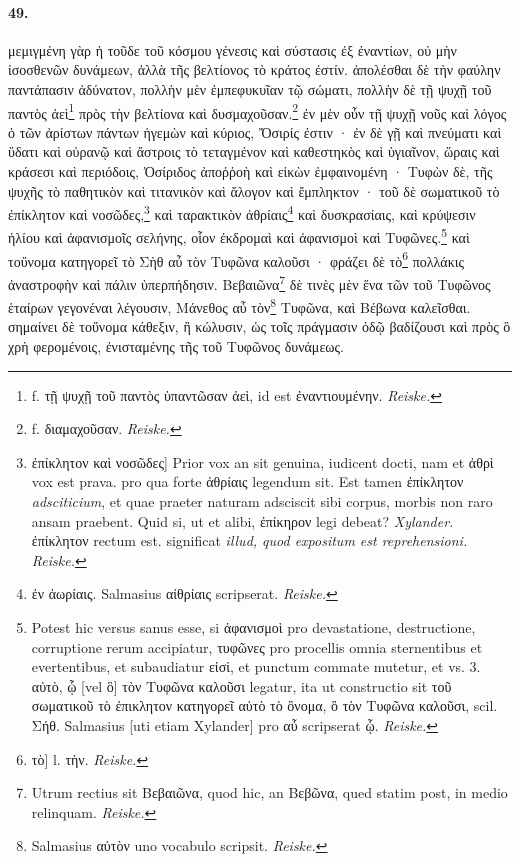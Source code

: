 \documentclass[a4paper, 11pt, oneside, polutonikogreek, german, landscape]{article}
\begin{document}
\paragraph{49.}
μεμιγμένη γὰρ ἡ τοῦδε τοῦ κόσμου γένεσις καὶ σύστασις ἐξ ἐναντίων, οὐ μὴν ἰσοσθενῶν δυνάμεων, ἀλλὰ τῆς βελτίονος τὸ κράτος ἐστίν. ἀπολέσθαι δὲ τὴν φαύλην παντάπασιν ἀδύνατον, πολλὴν μὲν ἐμπεφυκυῖαν τῷ σώματι, πολλὴν δὲ τῇ ψυχῇ τοῦ παντὸς ἀεὶ\footnote{f. τῇ ψυχῇ τοῦ παντὸς ὑπαντῶσαν ἀεὶ, id est ἐναντιουμένην. \emph{Reiske.}} πρὸς τὴν βελτίονα καὶ δυσμαχοῦσαν.\footnote{f. διαμαχοῦσαν. \emph{Reiske.}} ἐν μὲν οὖν τῇ ψυχῇ νοῦς καὶ λόγος ὁ τῶν ἀρίστων πάντων ἡγεμὼν καὶ κύριος, Ὄσιρίς ἐστιν · ἐν δὲ γῇ καὶ πνεύματι καὶ ὕδατι καὶ οὐρανῷ καὶ ἄστροις τὸ τεταγμένον καὶ καθεστηκὸς καὶ ὑγιαῖνον, ὥραις καὶ κράσεσι καὶ περιόδοις, Ὀσίριδος ἀποῤῥοὴ καὶ εἰκὼν ἐμφαινομένη · Τυφὼν δὲ, τῆς ψυχῆς τὸ παθητικὸν καὶ τιτανικὸν καὶ ἄλογον καὶ ἔμπληκτον · τοῦ δὲ σωματικοῦ τὸ ἐπίκλητον καὶ νοσῶδες,\footnote{ἐπίκλητον καὶ νοσῶδες] Prior vox an sit genuina, iudicent docti, nam et ἀθρὶ vox est prava. pro qua forte ἀθρίαις legendum sit. Est tamen ἐπίκλητον \emph{adsciticium}, et quae praeter naturam adsciscit sibi corpus, morbis non raro ansam praebent. Quid si, ut et alibi, ἐπίκηρον legi debeat? \emph{Xylander.} ἐπίκλητον rectum est. significat \emph{illud, quod expositum est reprehensioni.} \emph{Reiske.}} καὶ ταρακτικὸν ἀθρίαις\footnote{ἐν ἀωρίαις. Salmasius αἰθρίαις scripserat. \emph{Reiske.} } καὶ δυσκρασίαις, καὶ κρύψεσιν ἡλίου καὶ ἀφανισμοῖς σελήνης, οἷον ἐκδρομαὶ καὶ ἀφανισμοὶ καὶ Τυφῶνες.\footnote{Potest hic versus sanus esse, si ἀφανισμοὶ pro devastatione, destructione, corruptione rerum accipiatur, τυφῶνες pro procellis omnia sternentibus et evertentibus, et subaudiatur εἰσὶ, et punctum commate mutetur, et vs. 3. αὐτὸ, ᾧ [vel ὃ] τὸν Τυφῶνα καλοῦσι legatur, ita ut constructio sit τοῦ σωματικοῦ τὸ ἐπικλητον κατηγορεῖ αὐτὸ τὸ ὂνομα, ὃ τὸν Τυφῶνα καλοῦσι, scil. Σήθ. Salmasius [uti etiam Xylander] pro αὖ scripserat ᾧ. \emph{Reiske.}} καὶ τοὔνομα κατηγορεῖ τὸ Σὴθ αὖ τὸν Τυφῶνα καλοῦσι · φράζει δὲ τὸ\footnote{τὸ] l. τὴν. \emph{Reiske.}} πολλάκις ἀναστροφὴν καὶ πάλιν ὑπερπήδησιν. Βεβαιῶνα\footnote{Utrum rectius sit Βεβαιῶνα, quod hic, an Βεβῶνα, qued statim post, in medio relinquam. \emph{Reiske.}} δὲ τινὲς μὲν ἕνα τῶν τοῦ Τυφῶνος ἑταίρων γεγονέναι λέγουσιν, Μάνεθος αὖ τὸν\footnote{Salmasius αὐτὸν uno vocabulo scripsit. \emph{Reiske.}} Τυφῶνα, καὶ Βέβωνα καλεῖσθαι. σημαίνει δὲ τοὔνομα κάθεξιν, ἢ κώλυσιν, ὡς τοῖς πράγμασιν ὁδῷ βαδίζουσι καὶ πρὸς ὃ χρὴ φερομένοις, ἐνισταμένης τῆς τοῦ Τυφῶνος δυνάμεως.
\end{document}
